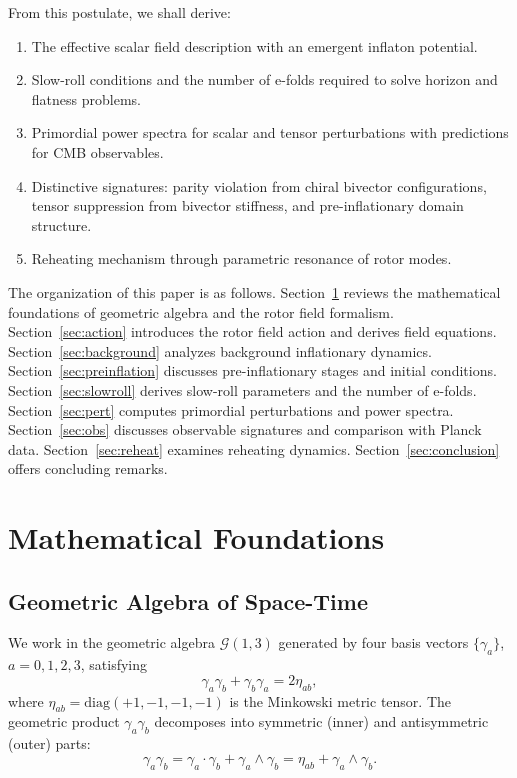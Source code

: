 \documentclass[11pt,a4paper]{article}
\numberwithin{equation}{section}
\theoremstyle{plain}
\theoremstyle{definition}
\theoremstyle{remark}
\begin{document}
From this postulate, we shall derive:

\begin{enumerate}
  \item The effective scalar field description with an emergent inflaton potential.
  \item Slow-roll conditions and the number of e-folds required to solve horizon and flatness problems.
  \item Primordial power spectra for scalar and tensor perturbations with predictions for CMB observables.
  \item Distinctive signatures: parity violation from chiral bivector configurations, tensor suppression from bivector stiffness, and pre-inflationary domain structure.
  \item Reheating mechanism through parametric resonance of rotor modes.
\end{enumerate}

The organization of this paper is as follows. Section~\ref{sec:prelim} reviews the mathematical foundations of geometric algebra and the rotor field formalism. Section~\ref{sec:action} introduces the rotor field action and derives field equations. Section~\ref{sec:background} analyzes background inflationary dynamics. Section~\ref{sec:preinflation} discusses pre-inflationary stages and initial conditions. Section~\ref{sec:slowroll} derives slow-roll parameters and the number of e-folds. Section~\ref{sec:pert} computes primordial perturbations and power spectra. Section~\ref{sec:obs} discusses observable signatures and comparison with Planck data. Section~\ref{sec:reheat} examines reheating dynamics. Section~\ref{sec:conclusion} offers concluding remarks.

\section{Mathematical Foundations}
\label{sec:prelim}

\subsection{Geometric Algebra of Space-Time}

We work in the geometric algebra $\mathcal{G}(1,3)$ generated by four basis vectors $\{\gamma_a\}$, $a=0,1,2,3$, satisfying
\begin{equation}
\gamma_a \gamma_b + \gamma_b \gamma_a = 2\eta_{ab},
\end{equation}
where $\eta_{ab} = \mathrm{diag}(+1,-1,-1,-1)$ is the Minkowski metric tensor. The geometric product $\gamma_a\gamma_b$ decomposes into symmetric (inner) and antisymmetric (outer) parts:
\begin{equation}
\gamma_a\gamma_b = \gamma_a \cdot \gamma_b + \gamma_a \wedge \gamma_b = \eta_{ab} + \gamma_a \wedge \gamma_b.
\end{equation}
\end{document}
